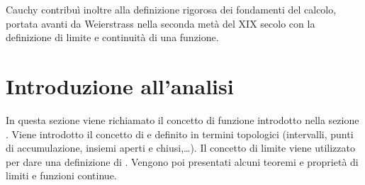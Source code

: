 \documentclass[letterpaper,10pt,italian]{jupyterBook}
\begin{document}
\sphinxAtStartPar
Cauchy contribuì inoltre alla definizione rigorosa dei fondamenti del calcolo, portata avanti da Weierstrass nella seconda metà del XIX secolo con la definizione di limite e continuità di una funzione.



\sphinxstepscope


\chapter{Introduzione all’analisi}
\label{\detokenize{ch/infinitesimal_calculus/analysis:introduzione-all-analisi}}\label{\detokenize{ch/infinitesimal_calculus/analysis:infinitesimal-calculus-analysis}}\label{\detokenize{ch/infinitesimal_calculus/analysis::doc}}
\sphinxAtStartPar
In questa sezione viene richiamato il concetto di funzione introdotto nella sezione {\hyperref[\detokenize{ch/precalculus:math-hs-precalculus}]{}}. Viene introdotto il concetto di {\hyperref[\detokenize{ch/infinitesimal_calculus/analysis:infinitesimal-calculus-limits}]{}} e definito in termini topologici (intervalli, punti di accumulazione, insiemi aperti e chiusi,…). Il concetto di limite viene utilizzato per dare una definizione di {\hyperref[\detokenize{ch/infinitesimal_calculus/analysis:infinitesimal-calculus-continuous-fun}]{}}. Vengono poi presentati alcuni teoremi e proprietà di limiti e funzioni continue.
\end{document}

